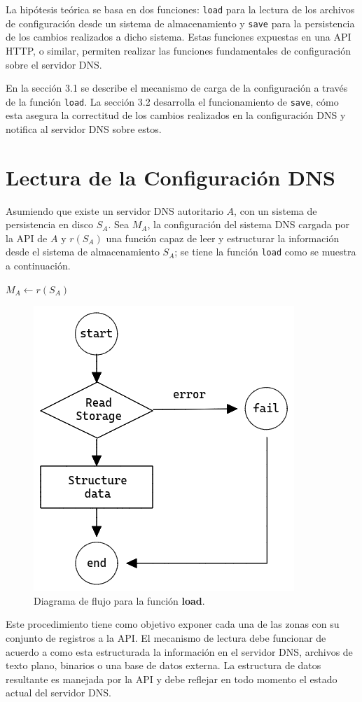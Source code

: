 La hipótesis teórica se basa en dos funciones: \verb+load+ para la lectura de los archivos de configuración desde un sistema de almacenamiento y \verb+save+ para la persistencia de los cambios realizados a dicho sistema. Estas funciones expuestas en una API HTTP, o similar, permiten realizar las funciones fundamentales de configuración sobre el servidor DNS.

En la sección 3.1 se describe el mecanismo de carga de la configuración a través de la función \verb|load|. La sección 3.2 desarrolla el funcionamiento de \verb|save|, cómo esta asegura la correctitud de los cambios realizados en la configuración DNS y notifica al servidor DNS sobre estos.

\section{Lectura de la Configuración DNS}

Asumiendo que existe un servidor DNS autoritario $A$, con un sistema de persistencia en disco $S_A$. Sea $M_A$, la configuración del sistema DNS cargada por la API de $A$ y $r(S_A)$ una función capaz de leer y estructurar la información desde el sistema de almacenamiento $S_A$; se tiene la función \verb+load+ como se muestra a continuación.

\begin{algorithmic}
    \State $M_A \leftarrow r(S_A)$
\EndProcedure
\end{algorithmic}

\begin{figure}[!ht]
    \centering
    \includegraphics[width=0.5\linewidth]{draws/load.png}
    \caption{Diagrama de flujo para la función \textbf{load}.}
\end{figure}

Este procedimiento tiene como objetivo exponer cada una de las zonas con su conjunto de registros a la API. El mecanismo de lectura debe funcionar de acuerdo a como esta estructurada la información en el servidor DNS, archivos de texto plano, binarios o una base de datos externa. La estructura de datos resultante es manejada por la API y debe reflejar en todo momento el estado actual del servidor DNS.

